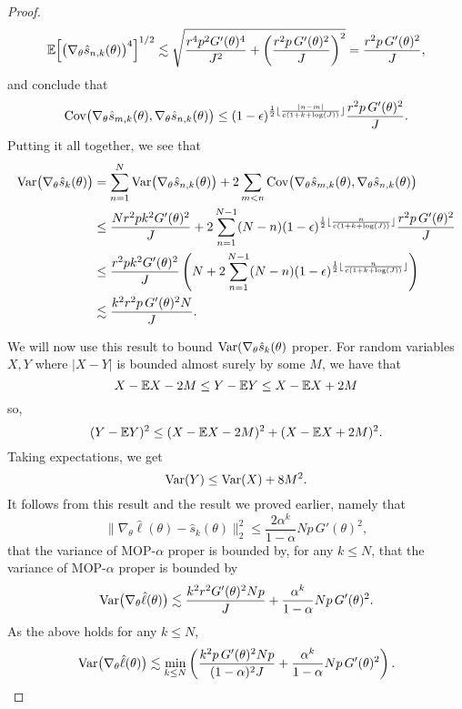 \begin{proof}
\begin{equation}
\mathbb{E}\Big[\big(\nabla_\theta\hat s_{n,k}(\theta)\big)^4\Big]^{1/2} \lesssim  \sqrt{\frac{r^4p^2G'(\theta)^4}{J^2}+\left(\frac{r^2p \, G'(\theta)^2}{J}\right)^2} = \frac{r^2p \, G'(\theta)^2}{J},
\end{equation}
and conclude that 
\begin{equation}\mathrm{Cov}\big(\nabla_\theta\hat s_{m,k}(\theta), \nabla_\theta\hat s_{n,k}(\theta)\big) \leq (1-\epsilon)^{\frac{1}{2}\lfloor \frac{|n-m|}{c(1+k+\log(J))} \rfloor}\frac{r^2p \, G'(\theta)^2}{J}.\end{equation}
Putting it all together, we see that
\begin{align}
    \mathrm{Var}\big(\nabla_\theta \hat s_{k}(\theta)\big) &= \sum_{n=1}^N \mathrm{Var}\big(\nabla_\theta\hat s_{n,k}(\theta)\big) + 2\sum_{m<n} \mathrm{Cov}\big(\nabla_\theta\hat s_{m,k}(\theta),\nabla_\theta\hat s_{n,k}(\theta)\big)
    \\
    &\leq \frac{Nr^2pk^2G'(\theta)^2}{J} + 2\sum_{n=1}^{N-1} (N-n)(1-\epsilon)^{\frac{1}{2}\lfloor \frac{n}{c(1+k+\log(J))} \rfloor}\frac{r^2p \, G'(\theta)^2}{J} 
    \\
    &\leq \frac{r^2pk^2G'(\theta)^2}{J} \left(N + 2\sum_{n=1}^{N-1} (N-n) (1-\epsilon)^{\frac{1}{2}\lfloor \frac{n}{c(1+k+\log(J))} \rfloor}\right) 
    \\
    &\lesssim \frac{k^2r^2p \, G'(\theta)^2N}{J}.
\end{align}

We will now use this result to bound $\mathrm{Var}(\nabla_\theta \hat s_k(\theta)$ proper. For random variables $X,Y$ where $|X-Y|$ is bounded almost surely by some $M$, we have that 
\begin{equation}X-\mathbb{E} X - 2M \leq Y - \mathbb{E} Y \leq X - \mathbb{E} X + 2M\end{equation}
so,
\begin{equation}(Y-\mathbb{E} Y)^2 \leq (X-\mathbb{E} X - 2M)^2 + (X-\mathbb{E} X +2M)^2.\end{equation}
Taking expectations, we get
\begin{equation}
\mathrm{Var}(Y) \leq \mathrm{Var}(X) + 8M^2.
\end{equation}
It follows from this result and the result we proved earlier, namely that
\begin{equation}
\big\|\nabla_\theta\hat\ell(\theta) - \hat s_k(\theta)\big\|_2^2 \leq \frac{2\alpha^k}{1-\alpha}Np \, G'(\theta)^2,
\end{equation}
that the variance of MOP-$\alpha$ proper is bounded by, for any $k \leq N$,
that the variance of MOP-$\alpha$ proper is bounded by
\begin{equation}
\mathrm{Var}\big(\nabla_\theta \hat\ell(\theta)\big) \lesssim \frac{k^2r^2G'(\theta)^2Np}{J} + \frac{\alpha^{k}}{1-\alpha}Np \, G'(\theta)^2.
\end{equation}
As the above holds for any $k \leq N$,
\begin{equation}
\mathrm{Var}\big(\nabla_\theta \hat\ell(\theta)\big) \lesssim \min_{k\leq N} \left(\frac{k^2p \, G'(\theta)^2Np}{(1-\alpha)^2J} + \frac{\alpha^{k}}{1-\alpha}Np \, G'(\theta)^2 \right).\end{equation}
\end{proof}



